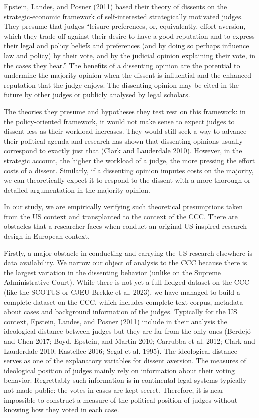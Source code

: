 \documentclass[
  11pt,
]{article}
\begin{document}
Epstein, Landes, and Posner (2011) based their theory of dissents on the
strategic-economic framework of self-interested strategically motivated
judges. They presume that judges ``leisure preferences, or,
equivalently, effort aversion, which they trade off against their desire
to have a good reputation and to express their legal and policy beliefs
and preferences (and by doing so perhaps influence law and policy) by
their vote, and by the judicial opinion explaining their vote, in the
cases they hear.'' The benefits of a dissenting opinion are the
potential to undermine the majority opinion when the dissent is
influential and the enhanced reputation that the judge enjoys. The
dissenting opinion may be cited in the future by other judges or
publicly analysed by legal scholars.

The theories they presume and hypotheses they test rest on this
framework: in the policy-oriented framework, it would not make sense to
expect judges to dissent less as their workload increases. They would
still seek a way to advance their political agenda and research has
shown that dissenting opinions usually correspond to exactly just that
(Clark and Lauderdale 2010). However, in the strategic account, the
higher the workload of a judge, the more pressing the effort costs of a
dissent. Similarly, if a dissenting opinion imputes costs on the
majority, we can theoretically expect it to respond to the dissent with
a more thorough or detailed argumentation in the majority opinion.

In our study, we are empirically verifying such theoretical presumptions
taken from the US context and transplanted to the context of the CCC.
There are obstacles that a researcher faces when conduct an original
US-inspired research design in European context.

Firstly, a major obstacle in conducting and carrying the US research
elsewhere is data availability. We narrow our object of analysis to the
CCC because there is the largest variation in the dissenting behavior
(unlike on the Supreme Administrative Court). While there is not yet a
full fledged dataset on the CCC (like the SCOTUS or CJEU Brekke et al.
2023), we have managed to build a complete dataset on the CCC, which
includes complete text corpus, metadata about cases and background
information of the judges. Typically for the US context, Epstein,
Landes, and Posner (2011) include in their analysis the ideological
distance between judges but they are far from the only ones (Berdejó and
Chen 2017; Boyd, Epstein, and Martin 2010; Carrubba et al. 2012; Clark
and Lauderdale 2010; Kastellec 2016; Segal et al. 1995). The ideological
distance serves as one of the explanatory variables for dissent
aversion. The measures of ideological position of judges mainly rely on
information about their voting behavior. Regrettably such information is
in continental legal systems typically not made public: the votes in
cases are kept secret. Therefore, it is near impossible to construct a
measure of the political position of judges without knowing how they
voted in each case.
\end{document}
